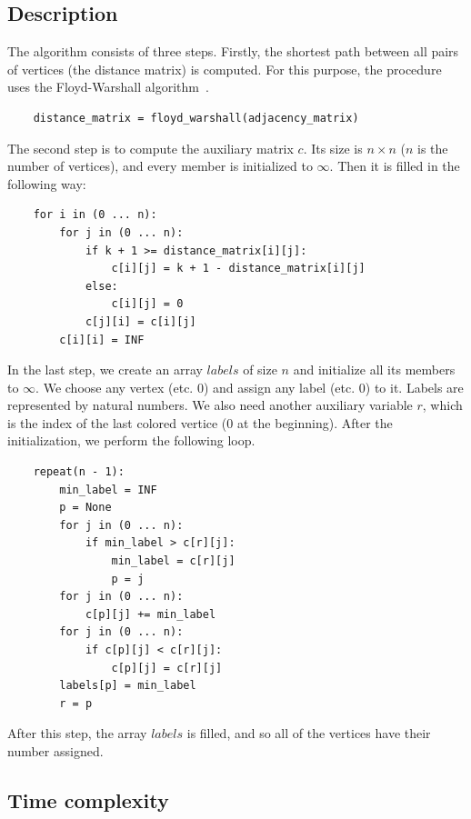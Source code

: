\documentclass[11pt,a4paper]{article}
\begin{document}
\subsection{Description}

The algorithm consists of three steps. Firstly, the shortest path between all pairs of vertices (the distance matrix) is computed. For this purpose, the procedure uses the Floyd-Warshall algorithm~\cite{wiki_floyd_warshall}.

\bigskip
\begin{lstlisting}
    distance_matrix = floyd_warshall(adjacency_matrix)
\end{lstlisting}
\bigskip

The second step is to compute the auxiliary matrix $c$. Its size is $n \times n$ ($n$ is the number of vertices), and every member is initialized to $\infty$. Then it is filled in the following way:

\bigskip
\begin{lstlisting}
    for i in (0 ... n):
        for j in (0 ... n):
            if k + 1 >= distance_matrix[i][j]:
                c[i][j] = k + 1 - distance_matrix[i][j]
            else:
                c[i][j] = 0
            c[j][i] = c[i][j]
        c[i][i] = INF
\end{lstlisting}
\bigskip

In the last step, we create an array $labels$ of size $n$ and initialize all its members to $\infty$. We choose any vertex (etc. $0$) and assign any label (etc. $0$) to it. Labels are represented by natural numbers. We also need another auxiliary variable $r$, which is the index of the last colored vertice ($0$ at the beginning). After the initialization, we perform the following loop.

\bigskip
\begin{lstlisting}
    repeat(n - 1):
        min_label = INF
        p = None
        for j in (0 ... n):
            if min_label > c[r][j]:
                min_label = c[r][j]
                p = j
        for j in (0 ... n):
            c[p][j] += min_label
        for j in (0 ... n):
            if c[p][j] < c[r][j]:
                c[p][j] = c[r][j]
        labels[p] = min_label
        r = p
\end{lstlisting}
\bigskip

After this step, the array $labels$ is filled, and so all of the vertices have their number assigned.

\subsection{Time complexity}
\end{document}
